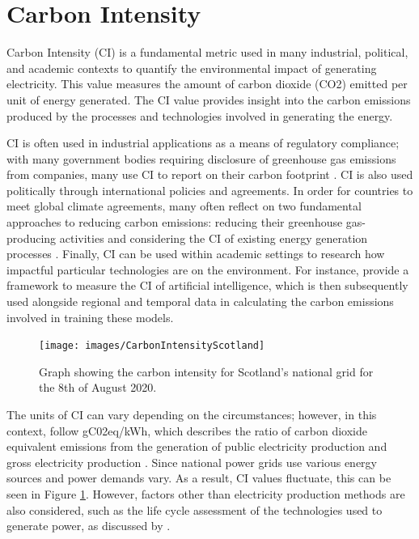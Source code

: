 \documentclass{l4proj}
\begin{document}
\section{Carbon Intensity}

Carbon Intensity (CI) is a fundamental metric used in many industrial, political, and academic contexts to quantify the environmental impact of generating electricity.
This value measures the amount of carbon dioxide (CO2) emitted per unit of energy generated.
The CI value provides insight into the carbon emissions produced by the processes and technologies involved in generating the energy.

CI is often used in industrial applications as a means of regulatory compliance; with many government bodies requiring disclosure of greenhouse gas emissions from companies, many use CI to report on their carbon footprint \citep{industry_ci}.
CI is also used politically through international policies and agreements.
In order for countries to meet global climate agreements, many often reflect on two fundamental approaches to reducing carbon emissions: reducing their greenhouse gas-producing activities and considering the CI of existing energy generation processes \cite{political_ci}.
Finally, CI can be used within academic settings to research how impactful particular technologies are on the environment.
For instance, \cite{academic_ci} provide a framework to measure the CI of artificial intelligence, which is then subsequently used alongside regional and temporal data in calculating the carbon emissions involved in training these models.

\begin{figure}[h]
    \centering
    \texttt{[image: images/CarbonIntensityScotland]}
    ~
    \caption{Graph showing the carbon intensity for Scotland's national grid for the 8th of August 2020.}
    \label{fig:carbonIntensityScotland}
\end{figure}

The units of CI can vary depending on the circumstances; however, in this context, follow gC02eq/kWh, which describes the ratio of carbon dioxide equivalent emissions from the generation of public electricity production and gross electricity production \citep{EEA_CO2_emission_intensity}.
Since national power grids use various energy sources and power demands vary.
As a result, CI values fluctuate, this can be seen in Figure \ref{fig:carbonIntensityScotland}.
However, factors other than electricity production methods are also considered, such as the life cycle assessment of the technologies used to generate power, as discussed by \cite{PEHNT200655}.
\end{document}
